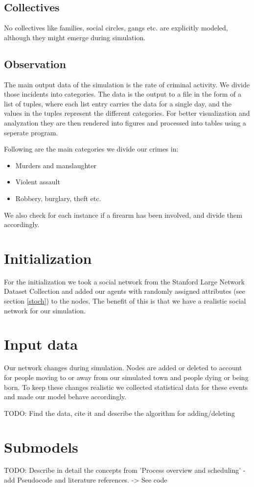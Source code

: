 \documentclass{article}
\begin{document}
		\subsection{Collectives}
			No collectives like families, social circles, gangs etc. are explicitly modeled,
			although they might emerge during simulation.

		\subsection{Observation}
			The main output data of the simulation is the rate of criminal activity. We divide
			those incidents into categories. The data is the output to a file in the form of a
			list of tuples, where each list entry carries the data for a single day, and the
			values in the tuples represent the different categories. For better visualization and
			analyzation they are then rendered into figures and processed into tables using a
			seperate program.
			\par
			Following are the main categories we divide our crimes in:
			\begin{itemize}
				\item Murders and manslaughter
				\item Violent assault
				\item Robbery, burglary, theft etc.
			\end{itemize}
			We also check for each instance if a firearm has been involved, and divide them
			accordingly.

	\section{Initialization}
		For the initialization we took a social network from the Stanford Large Network Dataset
		Collection \cite{snapnets} and added our agents with randomly assigned attributes (see
		section \ref{stoch}) to the nodes. The benefit of this is that we have a realistic
		social network for our simulation.

	\section{Input data}
		Our network changes during simulation. Nodes are added or deleted to account for
		people moving to or away from our simulated town and people dying or being born. To keep
		these changes realistic we collected statistical data for these events and made our model
		behave accordingly.
		\\\par
		TODO: Find the data, cite it and describe the algorithm for adding/deleting

	\section{Submodels}
		TODO: Describe in detail the concepts from 'Process overview and scheduling' - add
		Pseudocode and literature references. -> See code

	\medskip

	
	{}
\end{document}
